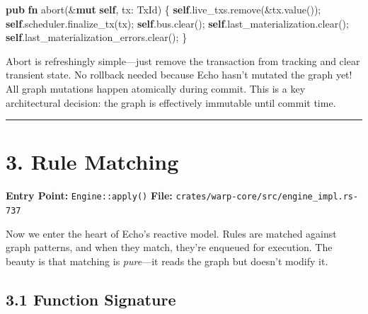 \documentclass[11pt]{book}
\newenvironment{Shaded}{}{}
\newcommand{\KeywordTok}[1]{\textcolor[rgb]{0.00,0.44,0.13}{\textbf{#1}}}
\newcommand{\NormalTok}[1]{#1}
\newcommand{\OperatorTok}[1]{\textcolor[rgb]{0.40,0.40,0.40}{#1}}
\begin{document}
\begin{Shaded}
\begin{Highlighting}[]
\KeywordTok{pub} \KeywordTok{fn}\NormalTok{ abort(}\OperatorTok{\&}\KeywordTok{mut} \KeywordTok{self}\OperatorTok{,}\NormalTok{ tx}\OperatorTok{:}\NormalTok{ TxId) }\OperatorTok{\{}
    \KeywordTok{self}\OperatorTok{.}\NormalTok{live\_txs}\OperatorTok{.}\NormalTok{remove(}\OperatorTok{\&}\NormalTok{tx}\OperatorTok{.}\NormalTok{value())}\OperatorTok{;}
    \KeywordTok{self}\OperatorTok{.}\NormalTok{scheduler}\OperatorTok{.}\NormalTok{finalize\_tx(tx)}\OperatorTok{;}
    \KeywordTok{self}\OperatorTok{.}\NormalTok{bus}\OperatorTok{.}\NormalTok{clear()}\OperatorTok{;}
    \KeywordTok{self}\OperatorTok{.}\NormalTok{last\_materialization}\OperatorTok{.}\NormalTok{clear()}\OperatorTok{;}
    \KeywordTok{self}\OperatorTok{.}\NormalTok{last\_materialization\_errors}\OperatorTok{.}\NormalTok{clear()}\OperatorTok{;}
\OperatorTok{\}}
\end{Highlighting}
\end{Shaded}

\begin{tourguide}
Abort is refreshingly simple---just remove the transaction from tracking and clear transient state. No rollback needed because Echo hasn't mutated the graph yet! All graph mutations happen atomically during commit. This is a key architectural decision: the graph is effectively immutable until commit time.
\end{tourguide}

\begin{center}\rule{0.5\linewidth}{0.5pt}\end{center}

\section{3. Rule Matching}\label{rule-matching}

\textbf{Entry Point:} \texttt{Engine::apply()} \textbf{File:}
\texttt{crates/warp-core/src/engine\_impl.rs-737}

\begin{tourguide}
Now we enter the heart of Echo's reactive model. Rules are matched against graph patterns, and when they match, they're enqueued for execution. The beauty is that matching is \emph{pure}---it reads the graph but doesn't modify it.
\end{tourguide}

\subsection{3.1 Function Signature}\label{function-signature-1}
\end{document}
